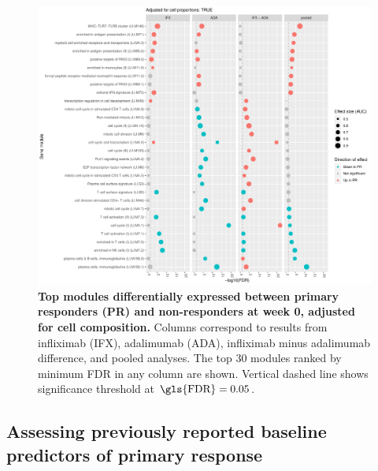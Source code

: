 \begin{figure}
    \centering
    \includegraphics[width=1.0\textwidth,page=1]{mainmatter/figures/chapter_04/plot_gene_set_enrichment.tmodCERNO_panelplot_reversed_C_1RI_1NI,C_1RA_1NA,C_(1RI_1NI)_(1RA_1NA),C_1R_1N.cell_prop_correction_TRUE.pdf}
    \caption{
        \textbf{Top modules differentially expressed between primary responders (PR) and non-responders at week 0, adjusted for cell composition.}
        Columns correspond to results from infliximab (IFX), adalimumab (ADA), infliximab minus adalimumab difference, and pooled analyses. 
        The top 30 modules ranked by minimum \gls{FDR} in any column are shown. Vertical dashed line shows significance threshold at $\text{\gls{FDR}} = 0.05$.
    }
    \label{fig:multipants_dge_panelPlot_week_0_R_N_cellPropT}
\end{figure}

\subsection{Assessing previously reported baseline predictors of primary response}


